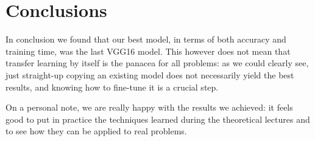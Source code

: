 \documentclass[10.5pt,a4paper,twocolumn]{article}
\begin{document}
\section{Conclusions}
\label{sec:conclusions}
In conclusion we found that our best model, in terms of both accuracy and training time, was the last VGG16 model.
This however does not mean that transfer learning by itself is the panacea for all problems: as we could clearly see, 
just straight-up copying an existing model does not necessarily yield the best results, and knowing how to fine-tune it is a crucial step.


On a personal note, we are really happy with the results we achieved: it feels good to put in practice
the techniques learned during the theoretical lectures and to see how they can be applied to real problems.

\newpage
\onecolumn
\end{document}
